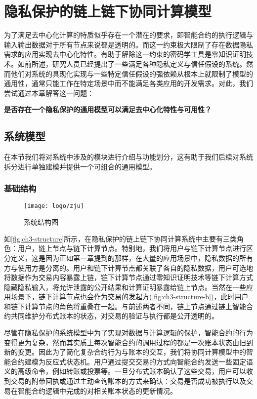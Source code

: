 \chapter{隐私保护的链上链下协同计算模型}

为了满足去中心化计算的特质似乎存在一个潜在的要求，即智能合约的执行逻辑与输入输出数据对于所有节点来说都是透明的。而这一约束极大限制了存在数据隐私需求的应用实现去中心化特性。有助于解除这一约束的密码学工具是零知识证明技术。如前所述，研究人员已经提出了一些满足各种隐私定义与信任假设的系统。然而他们对系统的具现化实现与一些特定信任假设的强依赖从根本上就限制了模型的通用性，通常只能工作在特定场景中而不能满足各类应用的开发需求。对此，我们尝试通过本章解答这一问题：
\begin{center}
    \textbf{是否存在一个隐私保护的通用模型可以满足去中心化特性与可用性？}
\end{center}
\section{系统模型}
在本节我们将对系统中涉及的模块进行介绍与功能划分，这有助于我们后续对系统拆分进行单独建模并提供一个可组合的通用模型。
\subsection{基础结构}
\begin{figure}[htbp]
    \centering
    \texttt{[image: logo/zju]}
    \caption{\label{fig:ch3-structure}系统结构图}
\end{figure}

如\autoref{fig:ch3-structure}所示，在隐私保护的链上链下协同计算系统中主要有三类角色：用户，链上节点与链下计算节点。特别地，我们将用户与链下计算节点进行区分定义，这是因为正如第一章提到的那样，在大量的应用场景中，隐私数据的所有方与使用方是分离的。用户和链下计算节点都关联了各自的隐私数据，用户可选地将数据作为交易内容暴露上链，链下计算节点通过零知识证明技术等链下计算方式隐藏隐私输入，将允许泄露的公开结果和计算证明暴露给链上节点。当然在一些应用场景下，链下计算节点也会作为交易的发起方(\autoref{fig:ch3-structure-b})，此时用户和链下计算节点的角色将重叠在一起。与前述两者不同，链上节点通过链上智能合约共同维护分布式账本的状态，对交易的验证与执行都是公开透明的。

尽管在隐私保护的系统模型中为了实现对数据与计算逻辑的保护，智能合约的行为变得更为复杂，然而其实质上每次智能合约的调用过程的都是一次账本状态由旧到新的变更。因此为了简化复杂合约行为与账本的交互，我们将协同计算模型中的智能合约建模为反应式状态机。用户通过提交交易的方式向智能合约发送一些固定语义的高级命令，例如转账或投票等。一旦分布式账本确认了这些交易，用户可以收到交易的附带回执或通过主动查询账本的方式来确认：交易是否成功被执行以及交易在智能合约逻辑中完成的对相关账本状态的更新情况。


